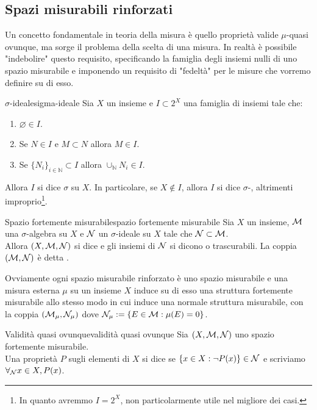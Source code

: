 \documentclass{article}
\renewcommand\N{\mc{N}}
\newcommand\Nat{\mathbb{N}}
\begin{document}
\pagebreak
\subsection{Spazi misurabili rinforzati}

Un concetto fondamentale in teoria della misura è quello proprietà valide $\mu$-quasi ovunque, ma sorge il problema della scelta di una misura. In realtà è possibile "indebolire" questo requisito, specificando la famiglia degli insiemi nulli di uno spazio misurabile e imponendo un requisito di "fedeltà" per le misure che vorremo definire su di esso.

\begin{definition}{$\sigma$-ideale}{sigma-ideale}
    Sia $X$ un insieme e $I \subset 2^X$ una famiglia di insiemi tale che:\begin{enumerate}
        \item $\varnothing \in I$.
        \item Se $N \in I$ e $M\subset N$ allora $M \in I$.
        \item Se $\{N_i\}_{i \in \Nat}\subset I$ allora $\cup_\Nat N_i \in I$.
    \end{enumerate}
    Allora $I$ si dice $\sigma$ su $X$. In particolare, se $X \notin I$, allora $I$ si dice $\sigma$-, altrimenti improprio\footnote{In quanto avremmo $I=2^X$, non particolarmente utile nel migliore dei casi.}.
\end{definition}

\begin{definition}{Spazio fortemente misurabile}{spazio fortemente misurabile}
    Sia $X$ un insieme, $\mathcal{M}$ una $\sigma$-algebra su $X$ e $\N$ un $\sigma$-ideale su $X$ tale che $\N\subset \M$.\\
    Allora $(X,\M,\N)$ si dice  e gli insiemi di $\N$ si dicono  o trascurabili. La coppia $(\M,\N)$ è detta .
\end{definition}

Ovviamente ogni spazio misurabile rinforzato è uno spazio misurabile e una misura esterna $\mu$ su un insieme $X$ induce su di esso una struttura fortemente misurabile allo stesso modo in cui induce una normale struttura misurabile, con la coppia $(\M_\mu, \N_\mu)$ dove $\N_\mu := \{E \in \M : \mu(E) = 0\}$.

\begin{definition}{Validità quasi ovunque}{validità quasi ovunque}
    Sia $(X,\M,\N)$ uno spazio fortemente misurabile.\\
    Una proprietà $P$ sugli elementi di $X$ si dice  se $\{x \in X : \neg P(x)\}\in \N$ e scriviamo $\forall_\N x \in X, P(x)$.
\end{definition}
\end{document}
